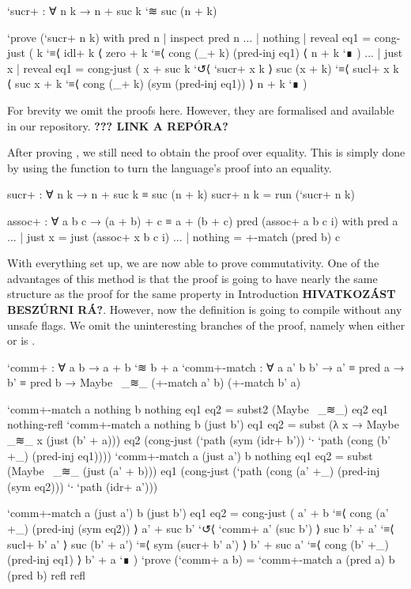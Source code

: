 \begin{code}
`sucr+ : ∀ n k → n + suc k `≋ suc (n + k)
\end{code}
\begin{code}[hide]
`prove (`sucr+ n k) with pred n | inspect pred n
... | nothing | reveal eq1 = cong-just (
  k
    `≡⟨ idl+ k ⟨
  zero + k
    `≡⟨ cong (_+ k) (pred-inj eq1) ⟨
  n + k `∎
  )
... | just x  | reveal eq1 = cong-just (
  x + suc k
    `↺⟨ `sucr+ x k ⟩
  suc (x + k)
    `≡⟨ sucl+ x k ⟨
  suc x + k
    `≡⟨ cong (_+ k) (sym (pred-inj eq1)) ⟩
  n + k `∎
  )
\end{code}

For brevity we omit the proofs here. However, they are formalised and available in our repository. \textbf{??? LINK A REPÓRA?}

After proving , we still need to obtain the proof over equality.
This is simply done by using the  function to turn the language's proof
into an equality.

\begin{code}
sucr+ : ∀ n k → n + suc k ≡ suc (n + k)
sucr+ n k = run (`sucr+ n k)
\end{code}
\begin{code}[hide]
assoc+ : ∀ a b c → (a + b) + c ≡ a + (b + c)
pred (assoc+ a b c i) with pred a
... | just x = just (assoc+ x b c i)
... | nothing = +-match (pred b) c
\end{code}

With everything set up, we are now able to prove commutativity. One of the advantages
of this method is that the proof is going to have nearly the same structure as the proof
for the same property in Introduction \textbf{HIVATKOZÁST BESZÚRNI RÁ?}. However, now the definition is going to
compile without any unsafe flags. We omit the uninteresting branches of the proof, namely when either
 or  is .

\begin{code}
`comm+ : ∀ a b → a + b `≋ b + a
`comm+-match : ∀ a a' b b' → a' ≡ pred a → b' ≡ pred b → Maybe~ _≋_ (+-match a' b) (+-match b' a)
\end{code}
\begin{code}[hide]
`comm+-match a nothing b nothing eq1 eq2 = subst2 (Maybe~ _≋_) eq2 eq1 nothing-refl
`comm+-match a nothing b (just b') eq1 eq2 = subst (λ x → Maybe~ _≋_ x (just (b' + a))) eq2 (cong-just (`path (sym (idr+ b')) `∙ `path (cong (b' +_) (pred-inj eq1))))
`comm+-match a (just a') b nothing eq1 eq2 = subst (Maybe~ _≋_ (just (a' + b))) eq1 (cong-just (`path (cong (a' +_) (pred-inj (sym eq2))) `∙ `path (idr+ a')))
\end{code}
\begin{code}
`comm+-match a (just a') b (just b') eq1 eq2 = cong-just (
  a' + b
    `≡⟨ cong (a' +_) (pred-inj (sym eq2)) ⟩
  a' + suc b'
    `↺⟨ `comm+ a' (suc b') ⟩
  suc b' + a'
    `≡⟨ sucl+ b' a' ⟩
  suc (b' + a')
    `≡⟨ sym (sucr+ b' a') ⟩
  b' + suc a'
    `≡⟨ cong (b' +_) (pred-inj eq1) ⟩
  b' + a `∎
  )
`prove (`comm+ a b) = `comm+-match a (pred a) b (pred b) refl refl
\end{code}

